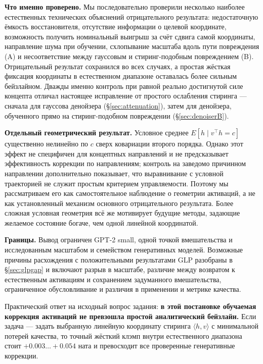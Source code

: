 \documentclass[10pt,a4paper]{article}
\begin{document}
\medskip
\textbf{Что именно проверено.} Мы последовательно проверили несколько наиболее
естественных технических объяснений отрицательного результата: недостаточную
ёмкость восстановителя, отсутствие информации о целевой координате, возможность
получить номинальный выигрыш за счёт сдвига самой координаты, направление шума
при обучении, схлопывание масштаба вдоль пути повреждения (A) и несоответствие
между гауссовым и стиринг-подобным повреждением (B). Отрицательный результат
сохранился во всех случаях, а простая жёсткая фиксация координаты в естественном
диапазоне оставалась более сильным бейзлайном. Дважды именно контроль при равной
реально достигнутой силе концепта отличал настоящее исправление от простого
ослабления стиринга — сначала для гауссова денойзера (\S\ref{sec:attenuation}),
затем для денойзера, обученного прямо на стиринг-подобном повреждении
(\S\ref{sec:denoiserB}).

\textbf{Отдельный геометрический результат.} Условное среднее
$E[h \mid v^\top h = c]$ существенно нелинейно по $c$ сверх ковариации второго
порядка. Однако этот эффект не специфичен для концептных направлений и не
предсказывает эффективность коррекции по направлениям; контроль на заведомо
причинном направлении дополнительно показывает, что выравнивание с условной
траекторией не служит простым критерием управляемости. Поэтому мы рассматриваем
его как самостоятельное наблюдение о геометрии активаций, а не как установленный
механизм основного отрицательного результата. Более сложная условная геометрия
всё же мотивирует будущие методы, задающие желаемое состояние богаче, чем одной
линейной координатой.

\textbf{Границы.} Вывод ограничен GPT-2 small, одной точкой вмешательства и
исследованным масштабом и семейством генеративных моделей. Возможные причины
расхождения с положительными результатами GLP разобраны в \S\ref{sec:glpgap} и
включают разрыв в масштабе, различие между возвратом к естественным активациям и
сохранением задуманного вмешательства, ограниченное обусловливание и различия в
применении и метрике качества.

\medskip
Практический ответ на исходный вопрос задания: \textbf{в этой постановке
обучаемая коррекция активаций не превзошла простой аналитический бейзлайн.} Если
задача — задать выбранную линейную координату стиринга $\langle h, v\rangle$ с
минимальной потерей качества, то точный жёсткий клэмп внутри естественного
диапазона стоит $+0.003\ldots+0.054$ ната и превосходит все проверенные
генеративные коррекции.
\end{document}
